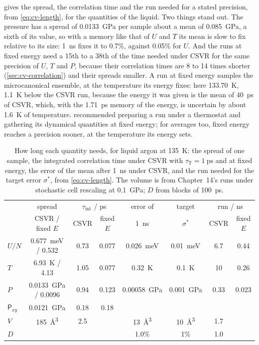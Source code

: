  gives the spread, the correlation time and the
run needed for a stated precision, from \cref{eq:cv-length}, for the
quantities of the liquid. Two things stand out. The pressure has a spread
of \SI{0.0133}{\giga\pascal} per sample about a mean of
\SI{0.085}{\giga\pascal}, a sixth of its value, so with a memory like that
of $U$ and $T$ its mean is slow to fix relative to its size:
\SI{1}{\nano\second} fixes it to 0.7\%, against 0.05\% for $U$. And the
runs at fixed energy need a 15th to a 38th of the time needed under CSVR
for the same precision of $U$, $T$ and $P$, because their correlation
times are 8 to 14 times shorter (\cref{sec:cv-correlation}) and their
spreads smaller. A run at fixed energy samples the microcanonical
ensemble, at the temperature its energy fixes: here \SI{133.70}{\kelvin},
\SI{1.1}{\kelvin} below the CSVR run, because the energy it was given is
the mean of \SI{40}{\pico\second} of CSVR, which, with the
\SI{1.71}{\pico\second} memory of the energy, is uncertain by about
\SI{1.6}{\kelvin} of temperature.
 recommended preparing a run under a thermostat and
gathering its dynamical quantities at fixed energy; for averages too,
fixed energy reaches a precision sooner, at the temperature its energy
sets.

\begin{table}[htb]
\centering
\small
\caption{How long each quantity needs, for liquid argon at
\SI{135}{\kelvin}: the spread of one sample, the integrated correlation
time under CSVR with $\tau_{\mathrm T} = \SI{1}{\pico\second}$ and at fixed
energy, the error of the mean after \SI{1}{\nano\second} under CSVR, and
the run needed for the target error $\sigma^\ast$, from
\cref{eq:cv-length}. The
volume is from Chapter~14's runs under stochastic cell rescaling at
\SI{0.1}{\giga\pascal}; $D$ from blocks of \SI{100}{\pico\second}.}
\label{tab:cv-observables}
\begin{tabular}{@{}lccccccc@{}}
\toprule
& spread & \multicolumn{2}{c}{$\tau_{\mathrm{int}}$ / ps} & error of
& target & \multicolumn{2}{c}{run / ns}\\
& CSVR / fixed $E$ & CSVR & fixed $E$ & \SI{1}{\nano\second} &
$\sigma^\ast$ & CSVR & fixed $E$\\
\midrule
$U/N$ & \SI{0.677}{\milli\electronvolt} / 0.532 & 0.73 & 0.077 &
\SI{0.026}{\milli\electronvolt} & \SI{0.01}{\milli\electronvolt} & 6.7 & 0.44\\
$T$ & \SI{6.93}{\kelvin} / 4.13 & 1.05 & 0.077 & \SI{0.32}{\kelvin} &
\SI{0.1}{\kelvin} & 10 & 0.26\\
$P$ & \SI{0.0133}{\giga\pascal} / 0.0096 & 0.94 & 0.123 &
\SI{0.00058}{\giga\pascal} & \SI{0.001}{\giga\pascal} & 0.33 & 0.023\\
$\mathsf{P}_{xy}$ & \SI{0.0121}{\giga\pascal} & 0.18 & 0.18 & & & &\\
$V$ & \SI{185}{\angstrom\cubed} & 2.5 & & \SI{13}{\angstrom\cubed} &
\SI{10}{\angstrom\cubed} & 1.7 &\\
$D$ & & & & 1.0\% & 1\% & 1.0 &\\
\bottomrule
\end{tabular}
\end{table}

